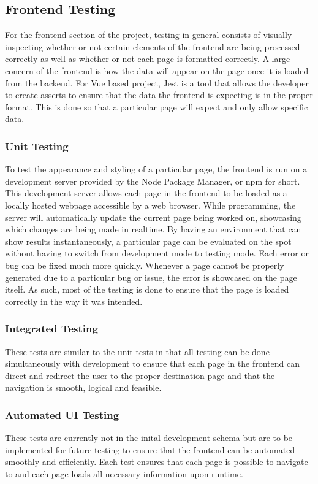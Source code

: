 {{{{{{{\subsection{Frontend Testing}
For the frontend section of the project, testing in general consists of visually inspecting whether or not certain elements of the frontend are being processed correctly as well as whether or not each page is formatted correctly. A large concern of the frontend is how the data will appear on the page once it is loaded from the backend. For Vue based project, Jest is a tool that allows the developer to create asserts to ensure that the data the frontend is expecting is in the proper format. This is done so that a particular page will expect and only allow specific data. 

\subsubsection{Unit Testing}
To test the appearance and styling of a particular page, the frontend is run on a development server provided by the Node Package Manager, or npm for short. This development server allows each page in the frontend to be loaded as a locally hosted webpage accessible by a web browser. While programming, the server will automatically update the current page being worked on, showcasing which changes are being made in realtime. By having an environment that can show results instantaneously, a particular page can be evaluated on the spot without having to switch from development mode to testing mode. Each error or bug can be fixed much more quickly. Whenever a page cannot be properly generated due to a particular bug or issue, the error is showcased on the page itself. As such, most of the testing is done to ensure that the page is loaded correctly in the way it was intended. 

\subsubsection{Integrated Testing}
These tests are similar to the unit tests in that all testing can be done simultaneously with development to ensure that each page in the frontend can direct and redirect the user to the proper destination page and that the navigation is smooth, logical and feasible.  

\subsubsection{Automated UI Testing}
These tests are currently not in the inital development schema but are to be implemented for future testing to ensure that the frontend can be automated smoothly and efficiently. Each test ensures that each page is possible to navigate to and each page loads all necessary information upon runtime.


}}}}}}}
